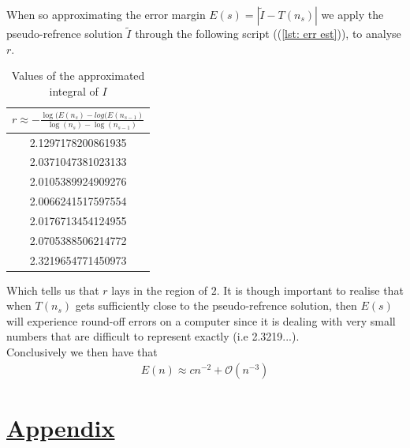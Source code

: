 \documentclass[12pt,
               a4paper,
               article,
               oneside,
               english,oldfontcommands]{memoir}
\let\oldref\ref
\renewcommand{\ref}[1]{(\oldref{#1})}
\begin{document}
When so approximating the error margin $E(s) = \left| \tilde{I} - T(n_s) \right|$ we apply the pseudo-refrence solution $\tilde{I}$ through the following script (\ref{lst: err est}), to analyse $r$. 
\begin{table}[H] 
  \begin{center} 
    \label{tab:con mont prob}
    \begin{tabular}{c} 
      $r \approx - \frac{\log(E(n_s) - log(E(n_{s-1})}{\log(n_s)- \log(n_{s-1})}$ \\
      \hline
  	2.1297178200861935\\
2.0371047381023133\\
2.0105389924909276\\
2.0066241517597554\\
2.0176713454124955\\
2.0705388506214772\\
2.3219654771450973\\
      \hline 
    \end{tabular}
     \caption{Values of the approximated integral of $I$}
  \end{center}
\end{table}
Which tells us that $r$ lays in the region of $2$. It is though important to realise that when $T(n_s)$ gets sufficiently close to the pseudo-refrence solution, then $E(s)$ will experience round-off errors on a computer since it is dealing with very small numbers that are difficult to represent exactly (i.e 2.3219...). \vspace{2mm}\\
Conclusively we then have that 
\begin{align*}
E(n) \approx cn^{-2} + \mathcal{O}(n^{-3})
\end{align*}
\section*{\centering \underline{Appendix}}
\end{document}
